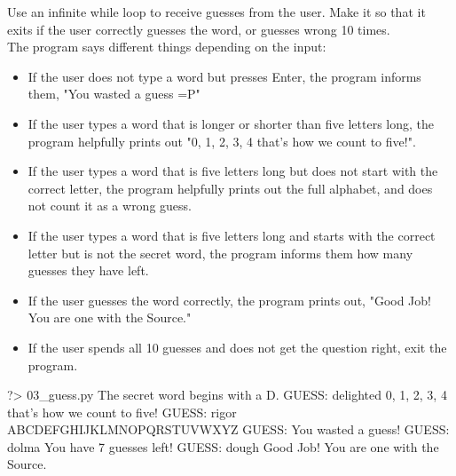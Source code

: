 \documentclass{42-en}
\begin{document}
Use an infinite while loop to receive guesses from the user. Make it so that it exits if the user correctly guesses the word, or guesses wrong 10 times.\\

The program says different things depending on the input:
\begin{itemize}
	\item If the user does not type a word but presses Enter, the program informs them, "You wasted a guess =P"
	\item If the user types a word that is longer or shorter than five letters long, the program helpfully prints out "0, 1, 2, 3, 4 that's how we count to five!". 
	\item If the user types a word that is five letters long but does not start with the correct letter, the program helpfully prints out the full alphabet, and does not count it as a wrong guess.
	\item If the user types a word that is five letters long and starts with the correct letter but is not the secret word, the program informs them how many guesses they have left.
	\item If the user guesses the word correctly, the program prints out, "Good Job! You are one with the Source."
	\item If the user spends all 10 guesses and does not get the question right, exit the program.
\end{itemize}

\begin{42console}
	?> 03_guess.py
	The secret word begins with a D.
	GUESS: delighted
	0, 1, 2, 3, 4 that's how we count to five!
	GUESS: rigor
	ABCDEFGHIJKLMNOPQRSTUVWXYZ
	GUESS:
	You wasted a guess!
	GUESS: dolma
	You have 7 guesses left!
	GUESS: dough
	Good Job! You are one with the Source.
\end{42console}
\end{document}
